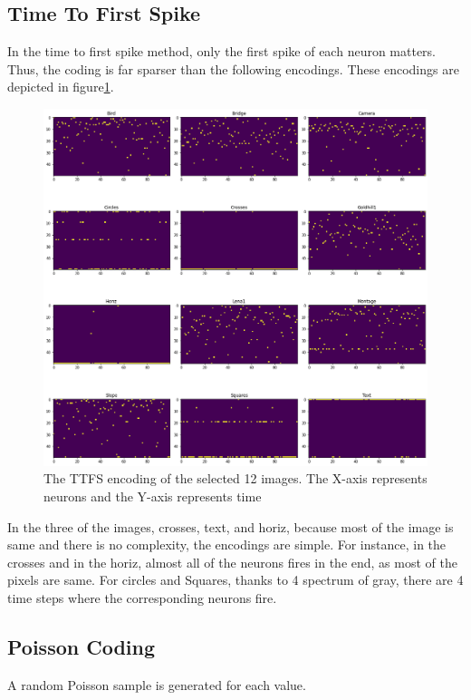 \documentclass{article}
\begin{document}
	\subsection{Time To First Spike}
	In the time to first spike method, only the first spike of each neuron matters. Thus, the coding is far sparser than the following encodings. These encodings are depicted in figure\ref{imttfs}.
	\begin{figure}[h]
		\includegraphics[width=1.2\textwidth]{images_ttfs.png}
		\caption{The TTFS encoding of the selected 12 images. The X-axis represents neurons and the Y-axis represents time}
		\label{imttfs}
	\end{figure}
	
	In the three of the images, crosses, text, and horiz, because most of the image is same and there is no complexity, the encodings are simple. For instance, in the crosses  and in the horiz, almost all of the neurons fires in the end, as most of the pixels are same. For circles and Squares, thanks to 4 spectrum of gray, there are 4 time steps where the corresponding neurons fire.
	\subsection{Poisson Coding}
	A random Poisson sample is generated for each value.
	
\end{document}
